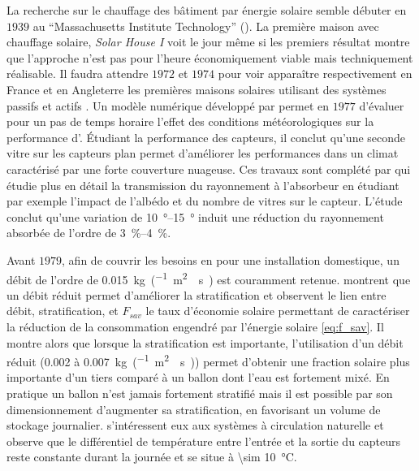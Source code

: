 La recherche sur le chauffage des bâtiment par énergie solaire semble débuter en $1939$ au
\enquote{Massachusetts Institute Technology} (). La première maison avec
chauffage solaire, 
{\textit{Solar House I}} voit le jour même si les premiers résultat
montre que l’approche n’est pas pour l’heure économiquement viable mais techniquement
réalisable. Il faudra attendre $1972$ et $1974$ pour voir apparaître respectivement
en France et en Angleterre les premières maisons solaires utilisant des systèmes passifs
et actifs \parencite{Michaelides1993}. Un modèle numérique développé par \textcite{Hunn197733}
permet en $1977$ d’évaluer pour un pas de temps horaire l’effet des conditions
météorologiques sur la performance d’. Étudiant la performance des capteurs, il
conclut qu’une seconde vitre sur les capteurs plan permet d’améliorer les performances
dans un climat caractérisé par une forte couverture nuageuse. Ces travaux sont complété
par \textcite{Elsayed198989} qui étudie plus en détail la transmission du rayonnement à
l’absorbeur en étudiant par exemple l’impact de l’albédo et du nombre de vitres sur le
capteur. L’étude conclut qu’une variation de \SIrange{10}{15}{\degree} induit une
réduction du rayonnement absorbée de l’ordre de \SIrange{3}{4}{\percent}.


Avant $1979$, afin de couvrir les besoins en  pour une installation domestique,
un débit de l’ordre de \SI{0.015}{kg\per(\metre\squared\period\second)}
est couramment retenue. \textcite{Koppen1979} montrent que un débit réduit
permet d’améliorer la stratification et \textcite{Wuestling1985}
observent le lien entre débit, stratification, et $F_{sav}$ le taux d’économie
solaire permettant de caractériser la réduction de la consommation engendré par
l’énergie solaire \eqref{eq:f_sav}. Il montre alors que lorsque la stratification est importante,
l’utilisation d’un débit réduit (\num{0.002} à \SI{0.007}{kg\per(\metre\squared\period\second)}) permet
d’obtenir une fraction solaire plus importante d’un tiers comparé à un ballon dont
l’eau est fortement mixé. En pratique un ballon n’est jamais fortement stratifié mais il est possible par son dimensionnement
d’augmenter sa stratification, en favorisant un volume de stockage journalier. \textcite{Loef1967}
s’intéressent eux aux systèmes à circulation naturelle et observe que le différentiel
de température entre l’entrée et la sortie du capteurs reste constante durant la journée
et se situe à \SI{\sim 10}{\celsius}.

